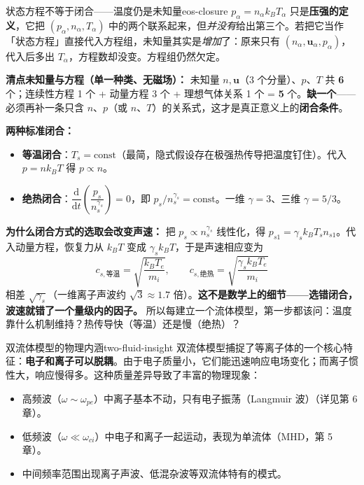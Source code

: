\documentclass[12pt,a4paper,openany,oneside]{book}
\newcommand{\diff}{\mathrm{d}}
\newcommand{\vect}[1]{\bm{#1}}
\begin{document}
\begin{warning}{状态方程不等于闭合——温度仍是未知量}{eos-closure}
$p_\alpha=n_\alpha k_BT_\alpha$ 只是\textbf{压强的定义}，它把 $(p_\alpha,n_\alpha,T_\alpha)$ 中的两个联系起来，但\emph{并没有}给出第三个。若把它当作「状态方程」直接代入方程组，未知量其实是\emph{增加}了：原来只有 $(n_\alpha,\vect{u}_\alpha,p_\alpha)$，代入后多出 $T_\alpha$，方程数却没变。方程组仍然欠定。

\textbf{清点未知量与方程（单一种类、无磁场）：} 未知量 $n,\vect{u}$（3 个分量）、$p$、$T$ 共 \textbf{6} 个；连续性方程 1 个 + 动量方程 3 个 + 理想气体关系 1 个 = \textbf{5} 个。\textbf{缺一个}——必须再补一条只含 $n$、$p$（或 $n$、$T$）的关系式，这才是真正意义上的\textbf{闭合条件}。

\textbf{两种标准闭合：}
\begin{itemize}
\item \textbf{等温闭合}：$T_s=\mathrm{const}$（最简，隐式假设存在极强热传导把温度钉住）。代入 $p= nk_BT$ 得 $p\propto n$。
\item \textbf{绝热闭合}：$\dfrac{\diff}{\diff t}\!\left(\dfrac{p_s}{n_s^{\gamma_s}}\right)=0$，即 $p_s/n_s^{\gamma_s}=\mathrm{const}$。一维 $\gamma=3$、三维 $\gamma=5/3$。
\end{itemize}

\textbf{为什么闭合方式的选取会改变声速：} 把 $p_s\propto n_s^{\gamma_s}$ 线性化，得 $p_{s1}=\gamma_s k_BT_s n_{s1}$。代入动量方程，恢复力从 $k_BT$ 变成 $\gamma_sk_BT$，于是声速相应变为
\[
c_{s,\text{等温}}=\sqrt{\frac{k_BT_e}{m_i}}, \qquad
c_{s,\text{绝热}}=\sqrt{\frac{\gamma_sk_BT_e}{m_i}}
\]
相差 $\sqrt{\gamma_s}$（一维离子声波约 $\sqrt3\approx1.7$ 倍）。\textbf{这不是数学上的细节——选错闭合，波速就错了一个量级内的因子。} 所以每建立一个流体模型，第一步都该问：温度靠什么机制维持？热传导快（等温）还是慢（绝热）？
\end{warning}

\begin{insight}{双流体模型的物理内涵}{two-fluid-insight}
双流体模型捕捉了等离子体的一个核心特征：\textbf{电子和离子可以脱耦}。由于电子质量小，它们能迅速响应电场变化；而离子惯性大，响应慢得多。这种质量差异导致了丰富的物理现象：
\begin{itemize}
\item 高频波（$\omega \sim \omega_{pe}$）中离子基本不动，只有电子振荡（Langmuir 波）（详见第 6 章）。
\item 低频波（$\omega \ll \omega_{ci}$）中电子和离子一起运动，表现为单流体（MHD，第 5 章）。
\item 中间频率范围出现离子声波、低混杂波等双流体特有的模式。
\end{itemize}
\end{insight}
\end{document}
